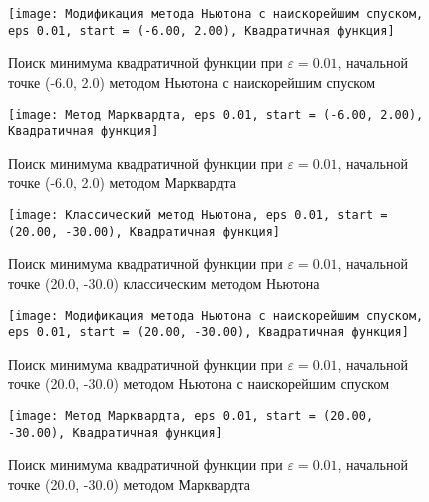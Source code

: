             \begin{figure}[H]
	        \centering
	        \texttt{[image: Модификация метода Ньютона с наискорейшим спуском, eps 0.01, start = (-6.00, 2.00), Квадратичная функция]}%
	        \caption{Поиск минимума квадратичной функции при $\varepsilon = 0.01$, начальной точке (-6.0, 2.0) методом Ньютона с наискорейшим спуском}
	        \vspace*{-1.2cm}
            \end{figure}
            
            \begin{figure}[H]
	        \centering
	        \texttt{[image: Метод Марквардта, eps 0.01, start = (-6.00, 2.00), Квадратичная функция]}%
	        \caption{Поиск минимума квадратичной функции при $\varepsilon = 0.01$, начальной точке (-6.0, 2.0) методом Марквардта}
	        \vspace*{-1.2cm}
            \end{figure}
            
            \begin{figure}[H]
	        \centering
	        \texttt{[image: Классический метод Ньютона, eps 0.01, start = (20.00, -30.00), Квадратичная функция]}%
	        \caption{Поиск минимума квадратичной функции при $\varepsilon = 0.01$, начальной точке (20.0, -30.0) классическим методом Ньютона}
	        \vspace*{-1.2cm}
            \end{figure}
            
            \begin{figure}[H]
	        \centering
	        \texttt{[image: Модификация метода Ньютона с наискорейшим спуском, eps 0.01, start = (20.00, -30.00), Квадратичная функция]}%
	        \caption{Поиск минимума квадратичной функции при $\varepsilon = 0.01$, начальной точке (20.0, -30.0) методом Ньютона с наискорейшим спуском}
	        \vspace*{-1.2cm}
            \end{figure}
            
            \begin{figure}[H]
	        \centering
	        \texttt{[image: Метод Марквардта, eps 0.01, start = (20.00, -30.00), Квадратичная функция]}%
	        \caption{Поиск минимума квадратичной функции при $\varepsilon = 0.01$, начальной точке (20.0, -30.0) методом Марквардта}
	        \vspace*{-1.2cm}
            \end{figure}
            
